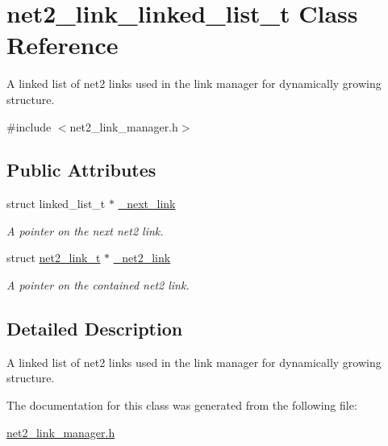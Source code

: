 \hypertarget{structnet2__link__linked__list__t}{\section{net2\-\_\-link\-\_\-linked\-\_\-list\-\_\-t Class Reference}
\label{structnet2__link__linked__list__t}
}


A linked list of net2 links used in the link manager for dynamically growing structure.  




{\ttfamily \#include $<$net2\-\_\-link\-\_\-manager.\-h$>$}

\subsection*{Public Attributes}
\begin{DoxyCompactItemize}
\item 
\hypertarget{structnet2__link__linked__list__t_afaf6079d2bd67288e7917b360a0e05c1}{struct linked\-\_\-list\-\_\-t $\ast$ \hyperlink{structnet2__link__linked__list__t_afaf6079d2bd67288e7917b360a0e05c1}{\-\_\-next\-\_\-link}}\label{structnet2__link__linked__list__t_afaf6079d2bd67288e7917b360a0e05c1}

\begin{DoxyCompactList}\small\item\em A pointer on the next net2 link. \end{DoxyCompactList}\item 
\hypertarget{structnet2__link__linked__list__t_a2fb62a0bca9adcc5182b75584524903f}{struct \hyperlink{structnet2__link__t}{net2\-\_\-link\-\_\-t} $\ast$ \hyperlink{structnet2__link__linked__list__t_a2fb62a0bca9adcc5182b75584524903f}{\-\_\-net2\-\_\-link}}\label{structnet2__link__linked__list__t_a2fb62a0bca9adcc5182b75584524903f}

\begin{DoxyCompactList}\small\item\em A pointer on the contained net2 link. \end{DoxyCompactList}\end{DoxyCompactItemize}


\subsection{Detailed Description}
A linked list of net2 links used in the link manager for dynamically growing structure. 

The documentation for this class was generated from the following file\-:\begin{DoxyCompactItemize}
\item 
\hyperlink{net2__link__manager_8h}{net2\-\_\-link\-\_\-manager.\-h}\end{DoxyCompactItemize}
